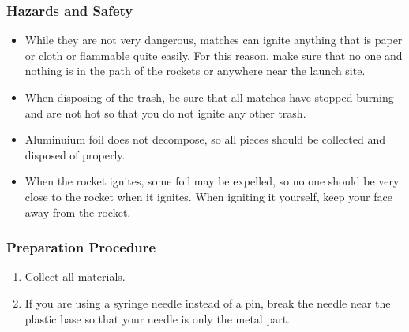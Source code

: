 \subsubsection*{Hazards and Safety}
\begin{itemize}
\item{While they are not very dangerous, matches can ignite anything that is paper or cloth or flammable quite easily. For this reason, make sure that no one and nothing is in the path of the rockets or anywhere near the launch site.} 
\item{When disposing of the trash, be sure that all matches have stopped burning and are not hot so that you do not ignite any other trash.} 
\item{Aluminuium foil does not decompose, so all pieces should be collected and disposed of properly.} 
\item{When the rocket ignites, some foil may be expelled, so no one should be very close to the rocket when it ignites. When igniting it yourself, keep your face away from the rocket.} 
\end{itemize}

\subsubsection*{Preparation Procedure}
\begin{enumerate}
\item{Collect all materials.} 
\item{If you are using a syringe needle instead of a pin, break the needle near the plastic base so that your needle is only the metal part.} 
\end{enumerate}

